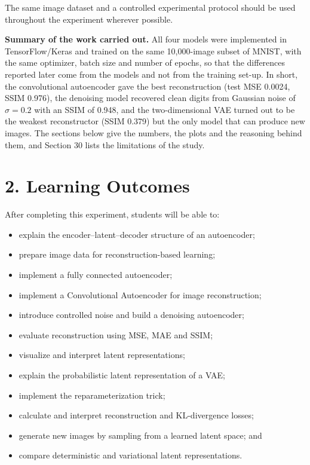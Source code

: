 \documentclass[10pt]{article}
\begin{document}
The same image dataset and a controlled experimental protocol should be used
throughout the experiment wherever possible.

\textbf{Summary of the work carried out.}
All four models were implemented in TensorFlow/Keras and trained on the same
10,000-image subset of MNIST, with the same optimizer, batch size and number of
epochs, so that the differences reported later come from the models and not
from the training set-up. In short, the convolutional autoencoder gave the best
reconstruction (test MSE 0.0024, SSIM 0.976), the denoising model recovered
clean digits from Gaussian noise of $\sigma=0.2$ with an SSIM of 0.948, and the
two-dimensional VAE turned out to be the weakest reconstructor (SSIM 0.379) but
the only model that can produce new images. The sections below give the
numbers, the plots and the reasoning behind them, and Section 30 lists the
limitations of the study.

\section*{2. Learning Outcomes}

After completing this experiment, students will be able to:

\begin{itemize}
\item explain the encoder--latent--decoder structure of an autoencoder;
\item prepare image data for reconstruction-based learning;
\item implement a fully connected autoencoder;
\item implement a Convolutional Autoencoder for image reconstruction;
\item introduce controlled noise and build a denoising autoencoder;
\item evaluate reconstruction using MSE, MAE and SSIM;
\item visualize and interpret latent representations;
\item explain the probabilistic latent representation of a VAE;
\item implement the reparameterization trick;
\item calculate and interpret reconstruction and KL-divergence losses;
\item generate new images by sampling from a learned latent space; and
\item compare deterministic and variational latent representations.
\end{itemize}
\end{document}
